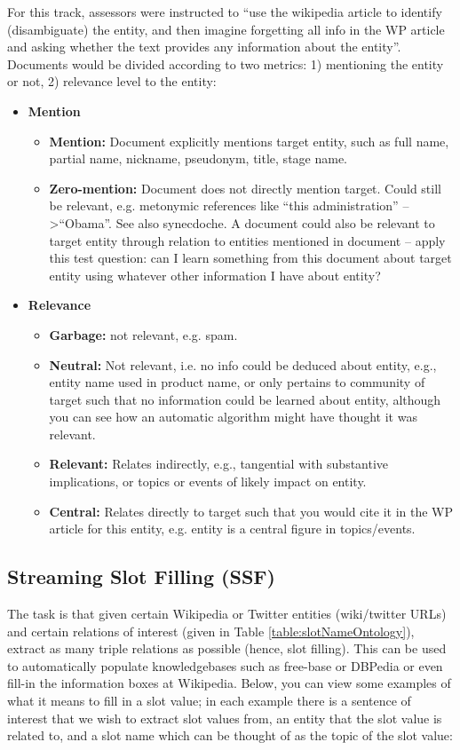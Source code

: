 For this track, assessors were instructed to ``use the wikipedia article to identify (disambiguate) the entity, and then imagine forgetting all info in the WP article and asking whether the text provides any information about the entity''\cite{JFrank12}. Documents would be divided according to two metrics: 1) mentioning the entity or not, 2) relevance level to the entity:
\begin{itemize}
\item \textbf{Mention} 
\begin{itemize}
\item \textbf{Mention:} Document explicitly mentions target entity, such as full name, partial name, nickname, pseudonym, title, stage name.
\item \textbf{Zero-mention:} Document does not directly mention target. Could still be relevant, e.g. metonymic references like ``this administration'' -- \textgreater ``Obama''. See also synecdoche. A document could also be relevant to target entity through relation to entities mentioned in document -- apply this test question: can I learn something from this document about target entity using whatever other information I have about entity?
\end{itemize}
\item \textbf{Relevance}
\begin{itemize}
\item \textbf{Garbage:} not relevant, e.g. spam.
\item \textbf{Neutral:} Not relevant, i.e. no info could be deduced about entity, e.g., entity name used in product name, or only pertains to community of target such that no information could be learned about entity, although you can see how an automatic algorithm might have thought it was relevant.
\item \textbf{Relevant:} Relates indirectly, e.g., tangential with substantive implications, or topics or events of likely
impact on entity.
\item \textbf{Central:} Relates directly to target such that you would cite it in the WP article for this entity, e.g. entity is a
central figure in topics/events.

\end{itemize}
\end{itemize}


\subsection{Streaming Slot Filling (SSF)}
The task is that given certain Wikipedia or Twitter entities 
(wiki/twitter URLs) and certain relations of interest (given in Table  \ref{table:slotNameOntology}), extract as many triple relations as possible (hence, slot filling). This can be used to automatically populate knowledgebases such as free-base or DBPedia 
or even fill-in the information boxes at Wikipedia. Below, you can view some examples of what it means to fill in a slot value; in each example there is a sentence of interest that we wish to extract slot values from, an entity that the slot value is related to, and a slot name which can be thought of as the topic of the slot value:

